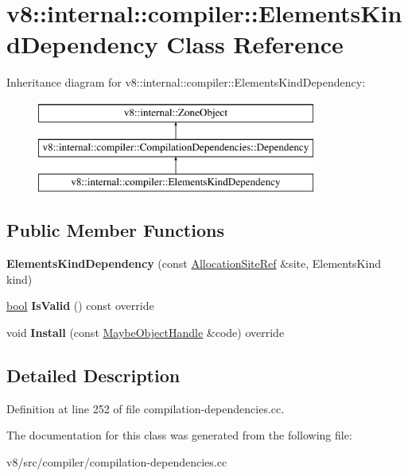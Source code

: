 \hypertarget{classv8_1_1internal_1_1compiler_1_1ElementsKindDependency}{}\section{v8\+:\+:internal\+:\+:compiler\+:\+:Elements\+Kind\+Dependency Class Reference}
\label{classv8_1_1internal_1_1compiler_1_1ElementsKindDependency}
Inheritance diagram for v8\+:\+:internal\+:\+:compiler\+:\+:Elements\+Kind\+Dependency\+:\begin{figure}[H]
\begin{center}
\leavevmode
\includegraphics[height=3.000000cm]{classv8_1_1internal_1_1compiler_1_1ElementsKindDependency}
\end{center}
\end{figure}
\subsection*{Public Member Functions}
\begin{DoxyCompactItemize}
\item 
\mbox{\label{classv8_1_1internal_1_1compiler_1_1ElementsKindDependency_a24d627d21cc33d81c6daaa405738f603}} 
{\bfseries Elements\+Kind\+Dependency} (const \mbox{\hyperlink{classv8_1_1internal_1_1compiler_1_1AllocationSiteRef}{Allocation\+Site\+Ref}} \&site, Elements\+Kind kind)
\item 
\mbox{\label{classv8_1_1internal_1_1compiler_1_1ElementsKindDependency_a8a9e56a077f05f5a60b4f5f2093253f9}} 
\mbox{\hyperlink{classbool}{bool}} {\bfseries Is\+Valid} () const override
\item 
\mbox{\label{classv8_1_1internal_1_1compiler_1_1ElementsKindDependency_a3c396451053d972af315c1ef6d701487}} 
void {\bfseries Install} (const \mbox{\hyperlink{classv8_1_1internal_1_1MaybeObjectHandle}{Maybe\+Object\+Handle}} \&code) override
\end{DoxyCompactItemize}


\subsection{Detailed Description}


Definition at line 252 of file compilation-\/dependencies.\+cc.



The documentation for this class was generated from the following file\+:\begin{DoxyCompactItemize}
\item 
v8/src/compiler/compilation-\/dependencies.\+cc\end{DoxyCompactItemize}
